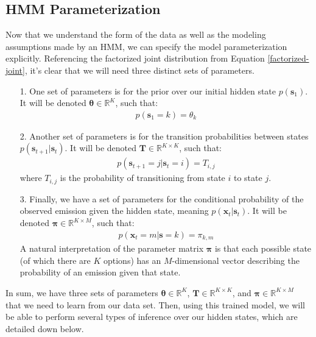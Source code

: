 \subsection{HMM Parameterization}
Now that we understand the form of the data as well as the modeling assumptions made by an HMM, we can specify the model parameterization explicitly. Referencing the factorized joint distribution from Equation \ref{factorized-joint}, it's clear that we will need three distinct sets of parameters.

\begin{itemize}
	\item[1.] One set of parameters is for the prior over our initial hidden state $p(\textbf{s}_1)$. It will be denoted $\boldsymbol{\theta} \in \mathbb{R}^{K}$, such that:
	\begin{align*}
		p(\textbf{s}_1 = k) = \theta_k
	\end{align*}

	\item[2.] Another set of parameters is for the transition probabilities between states $p(\textbf{s}_{t+1} | \textbf{s}_t)$. It will be denoted $\textbf{T} \in \mathbb{R}^{K \times K}$, such that:
	\begin{align*}
		p(\textbf{s}_{t+1} = j | \textbf{s}_t = i) = T_{i,j}
	\end{align*}
	where $T_{i,j}$ is the probability of transitioning from state $i$ to state $j$.

	\item[3.] Finally, we have a set of parameters for the conditional probability of the observed emission given the hidden state, meaning $p(\textbf{x}_t | \textbf{s}_t)$. It will be denoted $\boldsymbol{\pi} \in \mathbb{R}^{K \times M}$, such that:
	\begin{align*}
		p(\textbf{x}_t = m | \textbf{s} = k) = \pi_{k, m}
	\end{align*}
	A natural interpretation of the parameter matrix $\boldsymbol{\pi}$ is that each possible state (of which there are $K$ options) has an $M$-dimensional vector describing the probability of an emission given that state.
\end{itemize}

In sum, we have three sets of parameters $\boldsymbol{\theta} \in \mathbb{R}^{K}$, $\textbf{T} \in \mathbb{R}^{K \times K}$, and $\boldsymbol{\pi} \in \mathbb{R}^{K \times M}$ that we need to learn from our data set. Then, using this trained model, we will be able to perform several types of inference over our hidden states, which are detailed down below.

